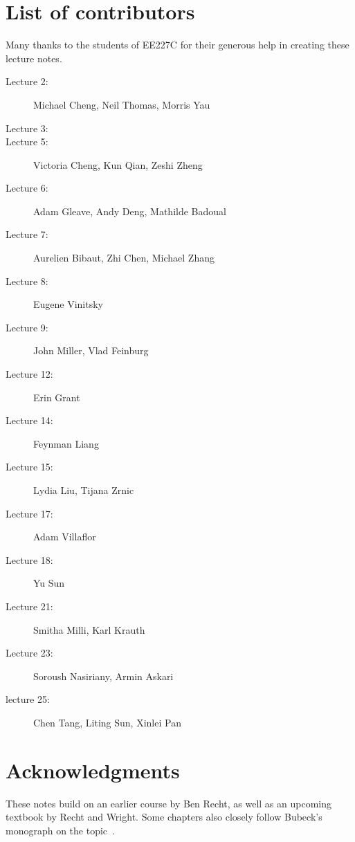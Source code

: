 \section{List of contributors}

Many thanks to the students of EE227C for their generous help in creating these
lecture notes.

\begin{description}
\item[Lecture 2:] Michael Cheng, Neil Thomas, Morris Yau
\item[Lecture 3:]
\item[Lecture 5:] Victoria Cheng, Kun Qian, Zeshi Zheng
\item[Lecture 6:] Adam Gleave, Andy Deng, Mathilde Badoual
\item[Lecture 7:] Aurelien Bibaut, Zhi Chen, Michael Zhang
\item[Lecture 8:] Eugene Vinitsky
\item[Lecture 9:] John Miller, Vlad Feinburg
\item[Lecture 12:] Erin Grant
\item[Lecture 14:] Feynman Liang
\item[Lecture 15:] Lydia Liu, Tijana Zrnic
\item[Lecture 17:] Adam Villaflor
\item[Lecture 18:] Yu Sun
\item[Lecture 21:] Smitha Milli, Karl Krauth
\item[Lecture 23:] Soroush Nasiriany, Armin Askari
\item[lecture 25:] Chen Tang, Liting Sun, Xinlei Pan
\end{description}

\section{Acknowledgments}

These notes build on an earlier course by Ben Recht, as well as an upcoming
textbook by Recht and Wright. Some chapters also closely follow Bubeck's
monograph on the topic~\cite{Bubeck}.
